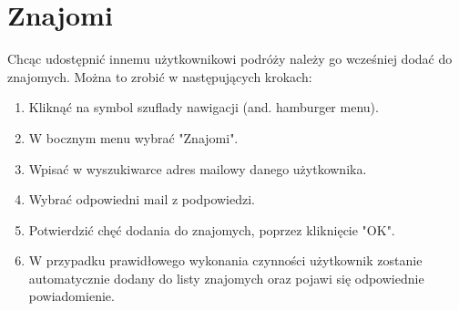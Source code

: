 \documentclass[10pt,twoside,a4paper]{report}
\begin{document}
\section{Znajomi}
Chcąc udostępnić innemu użytkownikowi podróży należy go wcześniej dodać do znajomych. Można to zrobić w następujących krokach:
\begin{enumerate}
\item Kliknąć na symbol szuflady nawigacji (and. hamburger menu).
\item W bocznym menu wybrać "Znajomi".
\item Wpisać w wyszukiwarce adres mailowy danego użytkownika.
\item Wybrać odpowiedni mail z podpowiedzi.
\item Potwierdzić chęć dodania do znajomych, poprzez kliknięcie "OK".
\item W przypadku prawidłowego wykonania czynności użytkownik zostanie automatycznie dodany do listy znajomych oraz pojawi się odpowiednie powiadomienie.
\end{enumerate}
\end{document}
